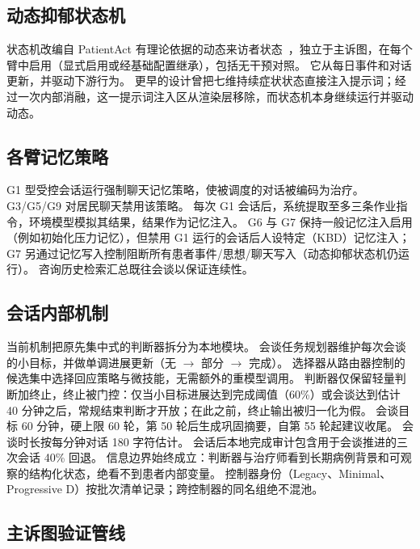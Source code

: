 \documentclass[11pt,a4paper]{article}
\begin{document}
\subsection{动态抑郁状态机}

状态机改编自 PatientAct 有理论依据的动态来访者状态~\citep{patientact2026}，独立于主诉图，在每个臂中启用（显式启用或经基础配置继承），包括无干预对照。
它从每日事件和对话更新，并驱动下游行为。
更早的设计曾把七维持续症状状态直接注入提示词；经过一次内部消融，这一提示词注入区从渲染层移除，而状态机本身继续运行并驱动动态。

\subsection{各臂记忆策略}

G1 型受控会话运行强制聊天记忆策略，使被调度的对话被编码为治疗。
G3/G5/G9 对居民聊天禁用该策略。
每次 G1 会话后，系统提取至多三条作业指令，环境模型模拟其结果，结果作为记忆注入。
G6 与 G7 保持一般记忆注入启用（例如初始化压力记忆），但禁用 G1 运行的会话后人设特定（KBD）记忆注入；G7 另通过记忆写入控制阻断所有患者事件/思想/聊天写入（动态抑郁状态机仍运行）。
咨询历史检索汇总既往会谈以保证连续性。

\subsection{会话内部机制}

当前机制把原先集中式的判断器拆分为本地模块。
会谈任务规划器维护每次会谈的小目标，并做单调进展更新（无 $\rightarrow$ 部分 $\rightarrow$ 完成）。
选择器从路由器控制的候选集中选择回应策略与微技能，无需额外的重模型调用。
判断器仅保留轻量判断加终止，终止被门控：仅当小目标进展达到完成阈值（60\%）或会谈达到估计 40 分钟之后，常规结束判断才开放；在此之前，终止输出被归一化为假。
会谈目标 60 分钟，硬上限 60 轮，第 50 轮后生成巩固摘要，自第 55 轮起建议收尾。
会谈时长按每分钟对话 180 字符估计。
会话后本地完成审计包含用于会谈推进的三次会话 40\% 回退。
信息边界始终成立：判断器与治疗师看到长期病例背景和可观察的结构化状态，绝看不到患者内部变量。
控制器身份（Legacy、Minimal、Progressive D）按批次清单记录；跨控制器的同名组绝不混池。

\subsection{主诉图验证管线}
\end{document}
